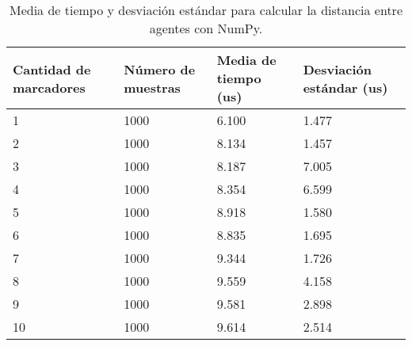 \begin{table}[H]
	\centering
	\resizebox{\textwidth}{!} {
	\begin{tabular}{|l|l|l|l|}
		\hline
		\textbf{Cantidad de marcadores} & \textbf{Número de muestras} & \textbf{Media de tiempo (us)} & \textbf{Desviación estándar (us)} \\ \hline
		1                               & 1000                        & 6.100                         & 1.477                             \\ \hline
		2                               & 1000                        & 8.134                         & 1.457                             \\ \hline
		3                               & 1000                        & 8.187                         & 7.005                             \\ \hline
		4                               & 1000                        & 8.354                         & 6.599                             \\ \hline
		5                               & 1000                        & 8.918                         & 1.580                             \\ \hline
		6                               & 1000                        & 8.835                         & 1.695                             \\ \hline
		7                               & 1000                        & 9.344                         & 1.726                             \\ \hline
		8                               & 1000                        & 9.559                         & 4.158                             \\ \hline
		9                               & 1000                        & 9.581                         & 2.898                             \\ \hline
		10                              & 1000                        & 9.614                         & 2.514                             \\ \hline
	\end{tabular}}
	\caption{Media de tiempo y desviación estándar para calcular la distancia entre agentes con NumPy.}
	\label{cuadro:tiempos_distancias_numpy}
\end{table}

